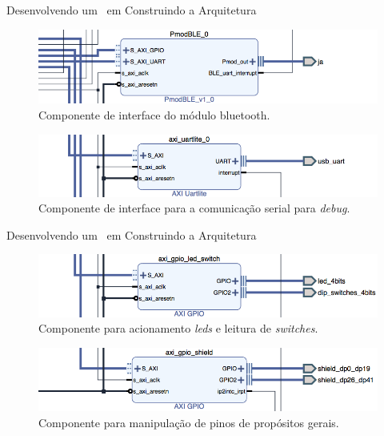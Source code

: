 \begin{frame}{Desenvolvendo um \Wearable\ em \Software }{Construindo a Arquitetura}
\vspace{-0.8em}
\begin{figure}[h] \centering
\includegraphics[width=1\textwidth]{img/vivado_software/4a-bluetooth.png}
\caption{Componente de interface do módulo bluetooth.}
\end{figure}
\begin{figure}[h] \centering
\includegraphics[width=1\textwidth]{img/vivado_software/4b-uart.png}
\caption{Componente de interface para a comunicação serial para \textit{debug}.}
\end{figure}
\end{frame}

\begin{frame}{Desenvolvendo um \Wearable\ em \Software }{Construindo a Arquitetura}
\vspace{-0.8em}
\begin{figure}[h] \centering
\includegraphics[width=1\textwidth]{img/vivado_software/5a-leds_switches.png}
\vspace{-1em}
\caption{Componente para acionamento \textit{leds} e leitura de \textit{switches}.}
\end{figure}
\begin{figure}[h] \centering
\includegraphics[width=1\textwidth]{img/vivado_software/5b-gpio.png}
\vspace{-1em}
\caption{Componente para manipulação de pinos de propósitos gerais.}
\end{figure}
\end{frame}

